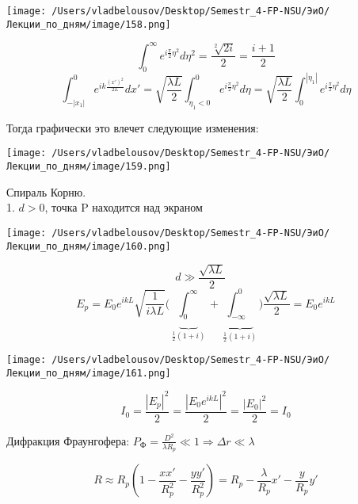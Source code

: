 \documentclass[12pt, a4paper]{report}
\begin{document}
\begin{center}
    \texttt{[image: /Users/vladbelousov/Desktop/Semestr\_4-FP-NSU/ЭиО/Лекции\_по\_дням/image/158.png]}
\end{center}


\[ \int_{0}^{\infty} e^{ i \frac{\pi }{2 }\eta  ^2  }d \eta ^2 = \frac{\sqrt[2]{2 i }}{2 } = \frac{ i  +1 }{2 }    \] 
\[ \int_{-|x_1| }^{0 } e^{ ik \frac{ (x ' ) ^2 }{2 L } } d x ' = \sqrt{\frac{ \lambda L }{2 } } \int_{\eta_1 < 0}^{0} e^{ i \frac{\pi}{2 }  \eta ^2 } d \eta = \sqrt{\frac{ \lambda L }{2 } } \int_{0}^{|\eta_1|} e^{ i \frac{\pi}{2 } \eta ^2 }  d \eta      \] 

Тогда графически это влечет следующие изменения:

\begin{center}
    \texttt{[image: /Users/vladbelousov/Desktop/Semestr\_4-FP-NSU/ЭиО/Лекции\_по\_дням/image/159.png]}
\end{center}
Спираль Корню. \\

1. \( d > 0 \), точка P находится над экраном

\begin{center}
    \texttt{[image: /Users/vladbelousov/Desktop/Semestr\_4-FP-NSU/ЭиО/Лекции\_по\_дням/image/160.png]}
\end{center}


\[ d \gg \frac{ \sqrt{\lambda L }}{2} \quad   \] 
\[ E_p = E_0 e^{i kL } \sqrt{\frac{1}{ i \lambda L } } \bigg( \underbrace{\int_{0}^{\infty}}_{\frac{1}{2} (1 +i)}  + \underbrace{\int_{-\infty}^{0} }_{\frac{1}{2 } (1+ i)} \bigg) \frac{\sqrt{\lambda L }}{2} = E_0 e^{ i kL}  \] 

\begin{center}
    \texttt{[image: /Users/vladbelousov/Desktop/Semestr\_4-FP-NSU/ЭиО/Лекции\_по\_дням/image/161.png]}
\end{center} 

\[ I_0 = \frac{\left\lvert E_p   \right\rvert ^2 } {2 } = \frac{ \left\lvert E_0 e^{i k L}  \right\rvert ^2 }{2 } = \frac{\left\lvert E_0  \right\rvert ^2 }{2 } = I_0    \] 

Дифракция Фраунгофера: \( \displaystyle  P_{\text{Ф} } = \frac{D ^2 }{\lambda R_{p }  } \ll 1 \Rightarrow \Delta r \ll \lambda    \) 

\[ R \approx R_p \left( 1 - \frac{ x x ' }{R_p ^2 } - \frac{ y y' }{R_p ^2 }   \right) = R_p - \frac{\lambda}{R_p }x '  - \frac{y }{R_p }y '   \] 
\end{document}
